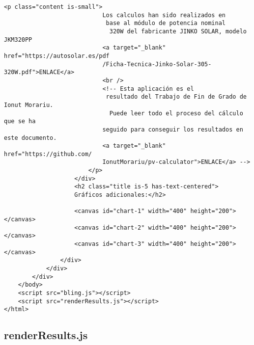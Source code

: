 \begin{lstlisting}[style=ES6, caption={public/results.html}]
						<p class="content is-small">
							Los calculos han sido realizados en
							 base al módulo de potencia nominal
							  320W del fabricante JINKO SOLAR, modelo JKM320PP
							<a target="_blank" href="https://autosolar.es/pdf
							/Ficha-Tecnica-Jinko-Solar-305-320W.pdf">ENLACE</a>
							<br />
							<!-- Esta aplicación es el
							 resultado del Trabajo de Fin de Grado de Ionut Morariu.
							  Puede leer todo el proceso del cálculo que se ha
							seguido para conseguir los resultados en este documento.
							<a target="_blank" href="https://github.com/
							IonutMorariu/pv-calculator">ENLACE</a> -->
						</p>
					</div>
					<h2 class="title is-5 has-text-centered">
					Gráficos adicionales:</h2>

					<canvas id="chart-1" width="400" height="200"></canvas>
					<canvas id="chart-2" width="400" height="200"></canvas>
					<canvas id="chart-3" width="400" height="200"></canvas>
				</div>
			</div>
		</div>
	</body>
	<script src="bling.js"></script>
	<script src="renderResults.js"></script>
</html>

\end{lstlisting}

\subsection{renderResults.js}

